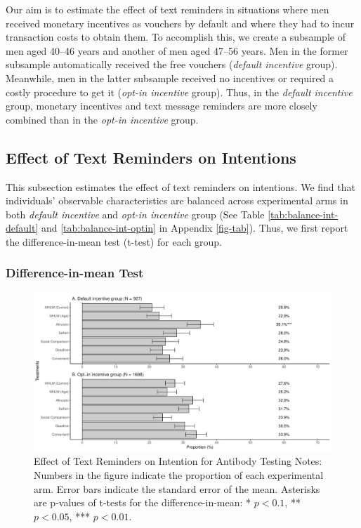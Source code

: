 \documentclass[
]{article}
\begin{document}
Our aim is to estimate the effect of text reminders in situations where men received monetary incentives as vouchers by default and where they had to incur transaction costs to obtain them. To accomplish this, we create a subsample of men aged 40--46 years and another of men aged 47--56 years. Men in the former subsample automatically received the free vouchers (\emph{default incentive} group). Meanwhile, men in the latter subsample received no incentives or required a costly procedure to get it (\emph{opt-in incentive} group). Thus, in the \emph{default incentive} group, monetary incentives and text message reminders are more closely combined than in the \emph{opt-in incentive} group.

\hypertarget{intention}{%
\subsection{Effect of Text Reminders on Intentions}\label{intention}}

This subsection estimates the effect of text reminders on intentions. We find that individuals' observable characteristics are balanced across experimental arms in both \emph{default incentive} and \emph{opt-in incentive} group (See Table \ref{tab:balance-int-default} and \ref{tab:balance-int-optin} in Appendix \ref{fig-tab}). Thus, we first report the difference-in-mean test (t-test) for each group.

\hypertarget{difference-in-mean-test}{%
\subsubsection{Difference-in-mean Test}\label{difference-in-mean-test}}

\begin{figure}[t]
\includegraphics{discussion-paper_files/figure-latex/ttest-int-test-1} \caption{Effect of Text Reminders on Intention for Antibody Testing Notes: Numbers in the figure indicate the proportion of each experimental arm. Error bars indicate the standard error of the mean. Asterisks are p-values of t-tests for the difference-in-mean: * $p < 0.1$, ** $p < 0.05$, *** $p < 0.01$.}\label{fig:ttest-int-test}
\end{figure}
\end{document}
